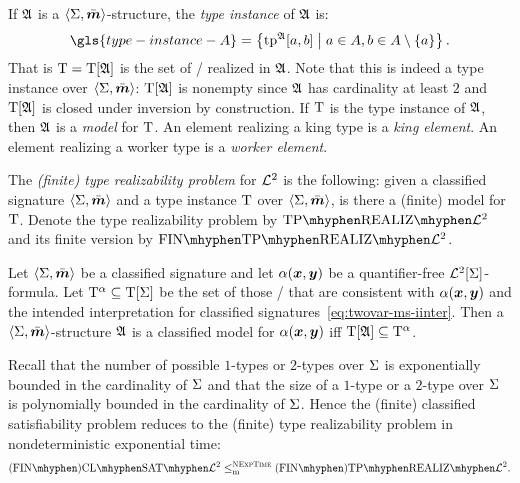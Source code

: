 If $\mathfrak{A}$ is a $\left\langle \mathrm{\Sigma},\bar{\bm{m}} \right\rangle$-structure, the \emph{type instance} of $\mathfrak{A}$
is:
\[
  \gls{type-instance-A} = \setbd{\tpIab\StrA\ea\eb}{
    \ea \in \domA, \eb \in \domA \sub\set\ea}.
\]
That is $\mathrm{T} = \mathrm{T}[\mathfrak{A}]$ is the set of \twotypes/ realized in $\mathfrak{A}$.
Note that this is indeed a type instance over $\left\langle \mathrm{\Sigma},\bar{\bm{m}} \right\rangle$:
$\mathrm{T}[\mathfrak{A}]$ is nonempty since $\mathfrak{A}$ has cardinality at least $2$
and $\mathrm{T}[\mathfrak{A}]$ is closed under inversion by construction.
If $\mathrm{T}$ is the type instance of $\mathfrak{A}$, then $\mathfrak{A}$ is a \emph{model} for
$\mathrm{T}$.
An element realizing a king type is a \emph{king element}.
An element realizing a worker type is a \emph{worker element}.

\begin{definition}
The \emph{(finite) type realizability problem} for $\mathcal{L}^{2}$ is the following:
given a classified signature $\left\langle \mathrm{\Sigma},\bar{\bm{m}} \right\rangle$ and a type instance $\mathrm{T}$ over
$\left\langle \mathrm{\Sigma},\bar{\bm{m}} \right\rangle$, is there a (finite) model for $\mathrm{T}$.
Denote the type realizability problem by $\Real{\vFo2}$ and its finite version
by $\FinReal{\vFo2}$.
\end{definition}

\begin{remark}\label{rem:red-sat-to-real}
Let $\left\langle \mathrm{\Sigma},\bar{\bm{m}} \right\rangle$ be a classified signature and let $\alpha(\bm{x},\bm{y})$ be a
quantifier-free $\mathcal{L}^{2}[\mathrm{\Sigma}]$-formula.
Let $\mathrm{T}^\alpha \subseteq \mathrm{T}[\mathrm{\Sigma}]$ be the set of those \twotypes/ that are
consistent with $\alpha(\bm{x},\bm{y})$ and the intended interpretation
for classified signatures~\cref{eq:twovar-ms-iinter}.
Then a $\left\langle \mathrm{\Sigma},\bar{\bm{m}} \right\rangle$-structure $\mathfrak{A}$ is a classified model for
$\alpha(\bm{x},\bm{y})$ iff $\mathrm{T}[\mathfrak{A}] \subseteq \mathrm{T}^\alpha$.

Recall that the number of possible $1$-types or $2$-types over $\mathrm{\Sigma}$ is
exponentially bounded in the cardinality of $\mathrm{\Sigma}$ and that the size of a
$1$-type or a $2$-type over $\mathrm{\Sigma}$ is polynomially bounded in the cardinality
of $\mathrm{\Sigma}$.
Hence the (finite) classified satisfiability problem reduces to the
(finite) type realizability problem in nondeterministic exponential time:
\[
  \FinAClSat{\vFo2} \red\cNExpTime \FinAReal{\vFo2}.
\]
\end{remark}

